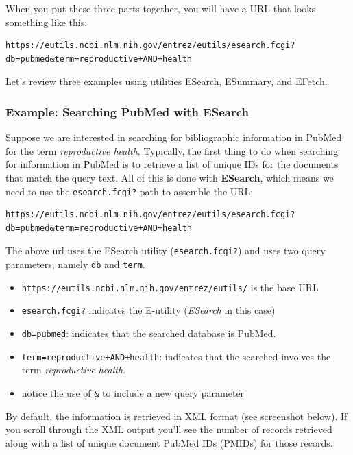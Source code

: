 \documentclass[
]{book}
\begin{document}
When you put these three parts together, you will have a URL that looks
something like this:

\begin{verbatim}
https://eutils.ncbi.nlm.nih.gov/entrez/eutils/esearch.fcgi?db=pubmed&term=reproductive+AND+health
\end{verbatim}

Let's review three examples using utilities ESearch, ESummary, and EFetch.

\hypertarget{example-searching-pubmed-with-esearch}{%
\subsubsection*{Example: Searching PubMed with ESearch}\label{example-searching-pubmed-with-esearch}}

Suppose we are interested in searching for bibliographic information in PubMed
for the term \emph{reproductive health}. Typically, the first thing to do when
searching for information in PubMed is to retrieve a list of unique IDs for
the documents that match the query text. All of this is done with \textbf{ESearch},
which means we need to use the \texttt{esearch.fcgi?} path to assemble the URL:

\begin{verbatim}
https://eutils.ncbi.nlm.nih.gov/entrez/eutils/esearch.fcgi?db=pubmed&term=reproductive+AND+health
\end{verbatim}

The above url uses the ESearch utility (\texttt{esearch.fcgi?}) and uses two query parameters, namely \texttt{db} and \texttt{term}.

\begin{itemize}
\item
  \texttt{https://eutils.ncbi.nlm.nih.gov/entrez/eutils/} is the base URL
\item
  \texttt{esearch.fcgi?} indicates the E-utility (\emph{ESearch} in this case)
\item
  \texttt{db=pubmed}: indicates that the searched database is PubMed.
\item
  \texttt{term=reproductive+AND+health}: indicates that the searched involves the
  term \emph{reproductive health}.
\item
  notice the use of \texttt{\&} to include a new query parameter
\end{itemize}

By default, the information is retrieved in XML format (see screenshot below).
If you scroll through the XML output you'll see the number of records retrieved
along with a list of unique document PubMed IDs (PMIDs) for those records.
\end{document}
